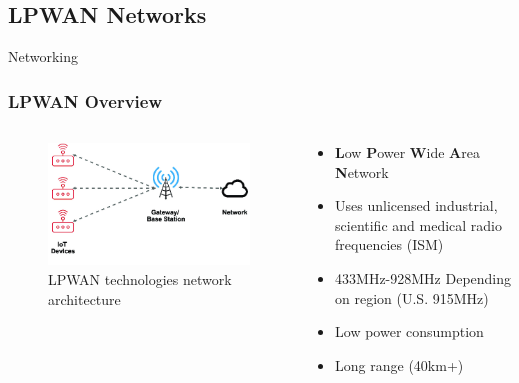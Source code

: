 \documentclass{beamer}
\begin{document}
\subsection{LPWAN Networks}

  \begin{frame}{Networking}
    \frametitle{LPWAN Overview}
    \begin{columns}
      \begin{column}{0.4\textwidth}
        \begin{figure}[htbp]
          \centering
          \includegraphics[width=\textwidth]{images/LPWAN-technologies-network-architecture.png}
          \caption{LPWAN technologies network architecture \cite{LoRaNetworkFernandez}}
          \label{fig:LPWAN_Network_architecture}
        \end{figure}
      \end{column}
      \begin{column}{0.6\textwidth}
        \begin{itemize}
          \item \textbf{L}ow \textbf{P}ower \textbf{W}ide \textbf{A}rea \textbf{N}etwork
          \item Uses unlicensed industrial, scientific and medical radio frequencies (ISM)
          \item 433MHz-928MHz Depending on region (U.S. 915MHz)
          \item Low power consumption
          \item Long range (40km+)
        \end{itemize}
      \end{column}
    \end{columns}
  \end{frame}
\end{document}

